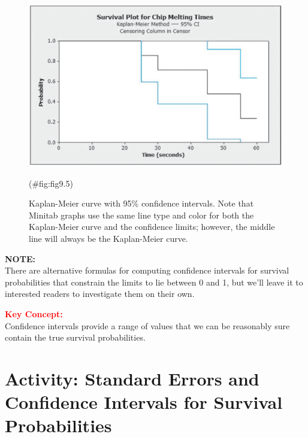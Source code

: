 \documentclass[
]{report}
\begin{document}
\begin{figure}

{\centering \includegraphics[width=1\linewidth]{docs/Fig9_5} 

}

\caption{Kaplan-Meier curve with 95\% confidence intervals. Note that Minitab graphs use the same line type and color for both the Kaplan-Meier curve and the confidence limits; however, the middle line will always be the Kaplan-Meier curve.}(\#fig:fig9.5)
\end{figure}

\large

\textbf{NOTE:}\\
There are alternative formulas for computing confidence intervals for survival probabilities that constrain the limits to lie between 0 and 1, but we'll leave it to interested readers to investigate them on their own.\\
\normalsize

\large

\textbf{\textcolor{red}{Key Concept:}}\\
\color{red}
Confidence intervals provide a range of values that we can be reasonably sure contain the true survival probabilities.\\
\color{black}
\normalsize

\section*{Activity: Standard Errors and Confidence Intervals for Survival Probabilities}\label{activity-standard-errors-and-confidence-intervals-for-survival-probabilities}
\end{document}
